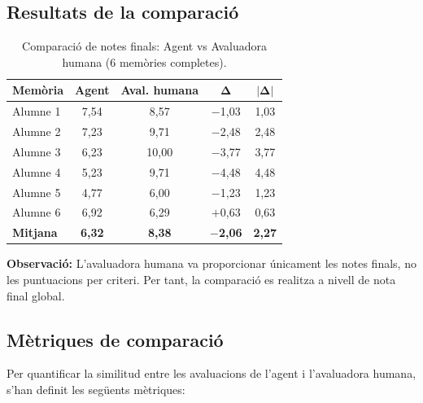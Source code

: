 \documentclass[12pt,a4paper,twoside]{report}
\begin{document}
\subsection{Resultats de la comparaci\'o}

\begin{table}[H]
\centering
\caption{Comparaci\'o de notes finals: Agent vs Avaluadora humana (6 mem\`ories completes).}
\label{tab:comparacio-notes}
\begin{tabular}{@{}lcccc@{}}
\toprule
\textbf{Mem\`oria} & \textbf{Agent} & \textbf{Aval. humana} & $\boldsymbol{\Delta}$ & $\boldsymbol{|\Delta|}$ \\
\midrule
Alumne 1 & 7,54 & 8,57 & $-$1,03 & 1,03 \\
Alumne 2 & 7,23 & 9,71 & $-$2,48 & 2,48 \\
Alumne 3 & 6,23 & 10,00 & $-$3,77 & 3,77 \\
Alumne 4 & 5,23 & 9,71 & $-$4,48 & 4,48 \\
Alumne 5 & 4,77 & 6,00 & $-$1,23 & 1,23 \\
Alumne 6 & 6,92 & 6,29 & $+$0,63 & 0,63 \\
\midrule
\textbf{Mitjana} & \textbf{6,32} & \textbf{8,38} & \textbf{$-$2,06} & \textbf{2,27} \\
\bottomrule
\end{tabular}
\end{table}

\textbf{Observaci\'o:} L'avaluadora humana va proporcionar \'unicament les notes finals, no les puntuacions per criteri. Per tant, la comparaci\'o es realitza a nivell de nota final global.

\subsection{M\`etriques de comparaci\'o}

Per quantificar la similitud entre les avaluacions de l'agent i l'avaluadora humana, s'han definit les seg\"uents m\`etriques:
\end{document}
